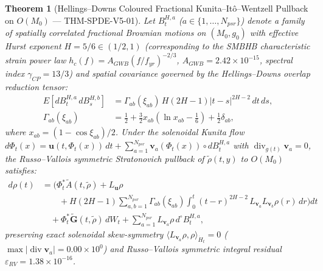 \documentclass[11pt,a4paper,reqno]{article}
\def\bm#1{#1}%
\def\texttt#1{#1}%
\def\mathrm#1{#1}%
\def\mathcal#1{#1}%
\def\mathbb#1{#1}%
\theoremstyle{plain}
\newtheorem{theorem}{Theorem}[section]
\theoremstyle{definition}
\theoremstyle{remark}
\numberwithin{equation}{section}
\begin{document}
\begin{theorem}[{Hellings--Downs Coloured Fractional Kunita--It\^o--Wentzell Pullback on $O(\mathcal{M}_0)$ --- \texttt{THM-SPDE-V5-01}}]\label{thm:spde_v5_sgwb_pullback}
Let $\mathcal{B}_t^{H,a}$ ($a \in \{1,\dots,N_{\mathrm{psr}}\}$) denote a family of spatially correlated fractional Brownian motions on $(\mathcal{M}_0, g_0)$ with effective Hurst exponent $H = 5/6 \in (1/2, 1)$ (corresponding to the SMBHB characteristic strain power law $h_c(f) = A_{\mathrm{GWB}}(f/f_{\mathrm{yr}})^{-2/3}$, $A_{\mathrm{GWB}} = 2.42 \times 10^{-15}$, spectral index $\gamma_{\mathrm{CP}} = 13/3$) and spatial covariance governed by the Hellings--Downs overlap reduction tensor:
\begin{equation}\label{eq:spde_v5_hd_covariance}
\begin{aligned}
  \mathbb{E}\!\left[ \mathrm{d}\mathcal{B}_t^{H,a}\,\mathrm{d}\mathcal{B}_s^{H,b} \right] &= \Gamma_{ab}(\xi_{ab})\,H(2H-1)|t - s|^{2H-2}\,\mathrm{d}t\,\mathrm{d}s, \\
  \Gamma_{ab}(\xi_{ab}) &= \frac{1}{2} + \frac{3}{2}x_{ab}\!\left(\ln x_{ab} - \frac{1}{6}\right) + \frac{1}{2}\delta_{ab},
\end{aligned}
\end{equation}
where $x_{ab} = (1 - \cos\xi_{ab})/2$. Under the solenoidal Kunita flow $\mathrm{d}\Phi_t(x) = \mathbf{u}(t,\Phi_t(x))\,\mathrm{d}t + \sum_{a=1}^{N_{\mathrm{psr}}} \mathbf{v}_a(\Phi_t(x)) \circ \mathrm{d}\mathcal{B}_t^{H,a}$ with $\operatorname{div}_{g(t)}\mathbf{v}_a = 0$, the Russo--Vallois symmetric Stratonovich pullback of $\tilde{\rho}(t,y)$ to $O(\mathcal{M}_0)$ satisfies:
\begin{align}\label{eq:spde_v5_fractional_ito_wentzell}
  \mathrm{d}\rho(t) &= \Biggl( \Phi_t^*\tilde{A}(t,\tilde{\rho}) + \mathcal{L}_{\mathbf{u}}\rho \nonumber\\
  &\qquad + H(2H-1)\sum_{a,b=1}^{N_{\mathrm{psr}}} \Gamma_{ab}(\xi_{ab})\!\int_0^t (t-r)^{2H-2}\,\mathcal{L}_{\mathbf{v}_a}\mathcal{L}_{\mathbf{v}_b}\rho(r)\,\mathrm{d}r \Biggr)\mathrm{d}t \nonumber\\
  &\quad + \Phi_t^*\tilde{\mathbf{G}}(t,\tilde{\rho})\,\mathrm{d}W_t + \sum_{a=1}^{N_{\mathrm{psr}}} \mathcal{L}_{\mathbf{v}_a}\rho\,\mathrm{d}^{\circ}\mathcal{B}_t^{H,a},
\end{align}
preserving exact solenoidal skew-symmetry $\langle \mathcal{L}_{\mathbf{v}_a}\rho, \rho \rangle_{\dot{H}_t} = 0$ ($\max|\operatorname{div}\mathbf{v}_a| = 0.00 \times 10^0$) and Russo--Vallois symmetric integral residual $\varepsilon_{\mathrm{RV}} = \bm{1.38 \times 10^{-16}}$.
\end{theorem}
\end{document}
